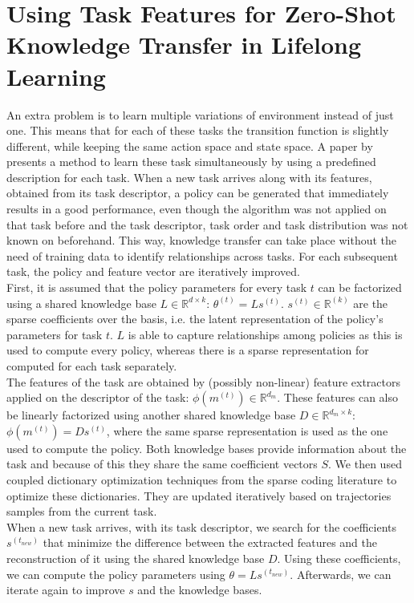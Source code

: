 \documentclass[a4paper]{article}
\begin{document}
\section{Using Task Features for Zero-Shot Knowledge Transfer in Lifelong Learning}
An extra problem is to learn multiple variations of environment instead of just one. This means that for each of these tasks the transition function is slightly different, while keeping the same action space and state space.
A paper by \cite{Isele2016UsingLearning} presents a method to learn these task simultaneously by using a predefined description for each task. When a new task arrives along with its features, obtained from its task descriptor, a policy can be generated that immediately results in a good performance, even though the algorithm was not applied on that task before and the task descriptor, task order and task distribution was not known on beforehand. This way, knowledge transfer can take place without the need of training data to identify relationships across tasks. For each subsequent task, the policy and feature vector are iteratively improved.\\
First, it is assumed that the policy parameters for every task $t$ can be factorized using a shared knowledge base $L \in \mathbb{R}^{d \times k}$: $\theta^{(t)} = Ls^{(t)}$. $s^{(t)} \in \mathbb{R}^{(k)}$ are the sparse coefficients over the basis, i.e. the latent representation of the policy's parameters for task $t$. $L$ is able to capture relationships among policies as this is used to compute every policy, whereas there is a sparse representation for computed for each task separately.\\
The features of the task are obtained by (possibly non-linear) feature extractors applied on the descriptor of the task: $\phi(m^{(t)}) \in \mathbb{R}^{d_m}$. These features can also be linearly factorized using another shared knowledge base $D \in \mathbb{R}^{d_m \times k}$: $\phi(m^{(t)}) = Ds^{(t)}$, where the same sparse representation is used as the one used to compute the policy. Both knowledge bases provide information about the task and because of this they share the same coefficient vectors $S$. We then used coupled dictionary optimization techniques from the sparse coding literature to optimize these dictionaries. They are updated iteratively based on trajectories samples from the current task.\\
When a new task arrives, with its task descriptor, we search for the coefficients $s^{(t_{new})}$ that minimize the difference between the extracted features and the reconstruction of it using the shared knowledge base $D$. Using these coefficients, we can compute the policy parameters using $\theta = Ls^{(t_{new})}$. Afterwards, we can iterate again to improve $s$ and the knowledge bases.
\end{document}
